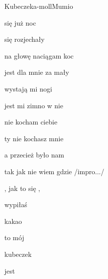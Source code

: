 \documentclass[a4paper,draft]{book}
\begin{document}
\begin{song}{Kubeczek}{a-moll}{}{Mumio}{}{}
	\begin{SBVerse}
	 się już noc

	 się rozjechały

	na głowę naciągam koc

	jest dla mnie za mały

	wystają mi nogi

	jest mi zimno w nie

	nie kocham ciebie

	ty nie kochasz mnie

	a przecież było nam

	tak jak nie wiem gdzie /impro.../
	\end{SBVerse}
	\begin{SBChorus}
	, jak to się ,

	 wypiłaś

	 kakao

	 to mój 

	 kubeczek

	 jest
	\end{SBChorus}
\end{song}
\end{document}
